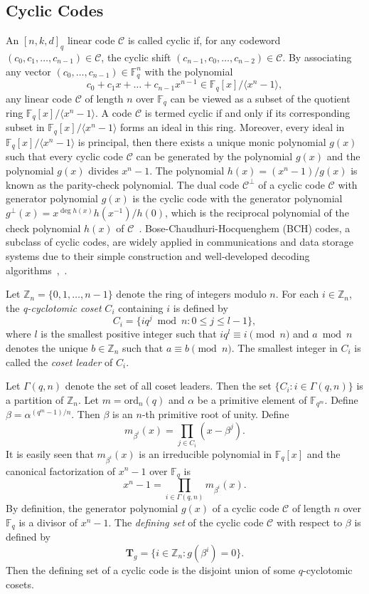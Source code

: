 \documentclass[10pt,a4paper]{amsart}
\begin{document}
\subsection{Cyclic Codes}
An $[n,k,d]_q$ linear code $\mathcal{C}$ is called cyclic if, for any codeword $(c_0,c_1,\dots,c_{n-1})\in\mathcal{C}$, the cyclic shift $(c_{n-1},c_0,\dots,c_{n-2})\in\mathcal{C}$. By associating any vector $(c_0,\dots,c_{n-1})\in\mathbb{F}_q^n$ with the polynomial \[c_0+c_1x+\dots +c_{n-1}x^{n-1}\in\mathbb{F}_q[x]/\langle x^n-1\rangle,\]
any linear code $\mathcal{C}$ of length $n$ over $\mathbb{F}_q$ can be viewed as a subset of the quotient ring $\mathbb{F}_q[x]/\langle x^n-1\rangle$. A code $\mathcal{C}$ is termed cyclic if and only if its corresponding subset in $\mathbb{F}_q[x]/\langle x^n-1\rangle$ forms an ideal in this ring. Moreover, every ideal in $\mathbb{F}_q[x]/\langle x^n-1\rangle$ is principal, then there exists a unique monic polynomial $g(x)$ such that every cyclic code $\mathcal{C}$ can be generated by the polynomial $g(x)$ and the polynomial $g(x)$ divides $x^n-1$. The polynomial $h(x)=(x^n-1)/g(x)$ is known as the parity-check polynomial. The dual code $\mathcal{C}^\perp$ of a cyclic code $\mathcal{C}$ with generator polynomial $g(x)$ is the cyclic code with the generator polynomial $g^\perp(x)=x^{\deg h(x)}h(x^{-1})/h(0)$, which is the reciprocal polynomial of the check polynomial $h(x)$ of $\mathcal{C}$~\cite{Roman1992Coding}. Bose-Chaudhuri-Hocquenghem (BCH) codes, a subclass of cyclic codes, are widely applied in communications and data storage systems due to their simple construction and well‑developed decoding algorithms~\cite{Bose1960a},~\cite{Hocquenghem1959}.

Let $\mathbb{Z}_n=\{0,1,\dots,n-1\}$ denote the ring of integers modulo $n$. For each $i\in \mathbb{Z}_n$, the \textit{q-cyclotomic coset} $C_i$ containing $i$ is defined by
\[C_i=\{iq^j\bmod  n:0\le j\le l-1\},\]
where $l$ is the smallest positive integer such that $iq^l\equiv i\pmod n$ and $a \bmod n$ denotes the unique $b\in \mathbb{Z}_n$ such that $a\equiv b\pmod n$. The smallest integer in $C_i$ is called the \textit{coset leader} of $C_i$.

Let $\Gamma(q,n)$ denote the set of all coset leaders. Then the set $\{C_i:i\in \Gamma(q,n)\}$ is a partition of $\mathbb{Z}_n$. Let $m=\mathrm{ord}_n(q)$ and $\alpha$ be a primitive element of $\mathbb{F}_{q^m}$. Define $\beta=\alpha^{(q^m-1)/n}$. Then $\beta$ is an $n$-th primitive root of unity. Define 
\[m_{\beta^i}(x)=\prod\limits_{j\in C_i} (x-\beta^j).\]
It is easily seen that $m_{\beta^i}(x)$ is an irreducible polynomial in $\mathbb{F}_q[x]$ and the canonical factorization of $x^n-1$ over $\mathbb{F}_q$ is 
\[x^n-1=\prod\limits_{i\in \Gamma(q,n)}m_{\beta^i}(x).\]
By definition, the generator polynomial $g(x)$ of a cyclic code $\mathcal{C}$ of length $n$ over $\mathbb{F}_q$ is a divisor of $x^n-1$. The \textit{defining set} of the cyclic code $\mathcal{C}$ with respect to $\beta$ is defined by 
\[\textbf{T}_g=\{i\in \mathbb{Z}_n:g(\beta^i)=0\}.\]
Then the defining set of a cyclic code is the disjoint union of some $q$-cyclotomic cosets.
\end{document}
